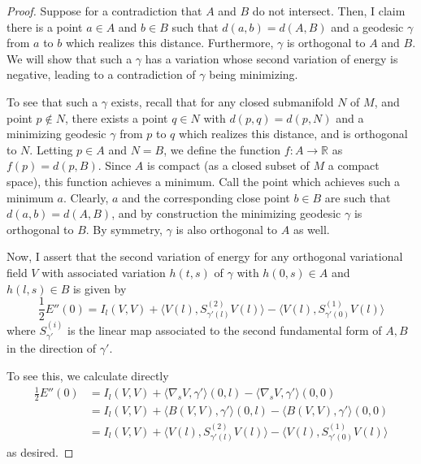 \documentclass[fontsize=11pt]{scrartcl} %
\numberwithin{equation}{section} %
\numberwithin{figure}{section} %
\numberwithin{table}{section} %
\newcommand{\R}{\mathbb{R}}
\begin{document}
\begin{proof}
    Suppose for a contradiction that $A$ and $B$ do not intersect. Then, I claim
    there is a point $a\in A$ and $b\in B$ such that $d(a,b) = d(A,B)$ and a
    geodesic $\gamma$ from $a$ to $b$ which realizes this distance. Furthermore,
    $\gamma$ is orthogonal to $A$ and $B$. We will show that such a $\gamma$ has
    a variation whose second variation of energy is negative, leading to a
    contradiction of $\gamma$ being minimizing.

    To see that such a $\gamma$ exists, recall that for any closed submanifold
    $N$ of $M$, and point $p\not\in N$, there exists a point $q\in N$ with
    $d(p,q) = d(p,N)$ and a minimizing geodesic $\gamma$ from $p$ to $q$ which
    realizes this distance, and is orthogonal to $N$. Letting $p\in A$ and
    $N=B$, we define the function $f:A\to \R$ as $f(p) = d(p,B)$. Since $A$ is
    compact (as a closed subset of $M$ a compact space), this function achieves
    a minimum. Call the point which achieves such a minimum $a$. Clearly, $a$
    and the corresponding close point $b\in B$ are such that $d(a,b) = d(A,B)$,
    and by construction the minimizing geodesic $\gamma$ is orthogonal to $B$.
    By symmetry, $\gamma$ is also orthogonal to $A$ as well.

    Now, I assert that the second variation of energy for any orthogonal
    variational field $V$ with associated variation $h(t,s)$ of $\gamma$ with
    $h(0,s)\in A$ and $h(l,s)\in B$ is given by
    \[
        \frac{1}{2}E''(0) = I_l(V,V) + \langle
        V(l),S^{(2)}_{\gamma'(l)}V(l)\rangle - \langle V(l),
        S^{(1)}_{\gamma'(0)}V(l)\rangle
    \]
    where $S^{(i)}_{\gamma'}$ is the linear map associated to the second
    fundamental form of $A,B$ in the direction of $\gamma'$.

    To see this, we calculate directly
    \[
        \begin{aligned}
            \frac{1}{2}E''(0) &= I_l(V,V) + \langle
            \nabla_sV,\gamma'\rangle(0,l) - \langle
            \nabla_sV,\gamma'\rangle(0,0)\\
            &= I_l(V,V) + \langle
            B(V,V),\gamma'\rangle(0,l) - \langle
            B(V,V),\gamma'\rangle(0,0)\\
            &= I_l(V,V) + \langle
        V(l),S^{(2)}_{\gamma'(l)}V(l)\rangle - \langle V(l),
        S^{(1)}_{\gamma'(0)}V(l)\rangle
        \end{aligned}
    \]
    as desired.


\end{proof}
\end{document}
